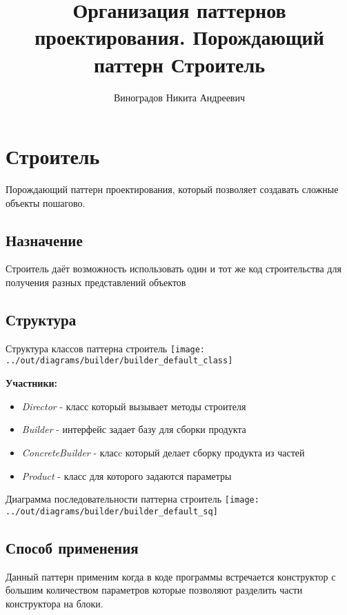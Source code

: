 \documentclass[PI,LAB]{HSEUniversity}
\title{Организация паттернов проектирования. Порождающий паттерн Строитель}
\author{Виноградов Никита Андреевич}
\begin{document}
    \maketitle



    \chapter{Строитель}
      Порождающий паттерн проектирования, который позволяет создавать сложные объекты пошагово. 
    \section{Назначение}
   Строитель даёт возможность использовать один и тот же код строительства для получения разных представлений объектов
    \section{Структура}

    \begin{FIGURE}[h]{Структура классов паттерна строитель\label{fig:example-figure}}
       \texttt{[image: ../out/diagrams/builder/builder\_default\_class]}
    \end{FIGURE}

    \textbf{Участники:}
   		\begin{itemize}
   			\item \emph{Director} - класс который вызывает методы строителя
   			\item \emph{Builder} - интерфейс задает базу для сборки продукта
   			\item \emph{ConcreteBuilder} - класc который делает сборку продукта из частей
   			\item \emph{Product} - класс для которого задаются параметры
   		\end{itemize}

 \begin{FIGURE}[h]{Диаграмма последовательности паттерна строитель\label{fig:example-figure}}
	\texttt{[image: ../out/diagrams/builder/builder\_default\_sq]}
\end{FIGURE}
    \section{Способ применения}
    Данный паттерн применим когда в коде программы встречается конструктор с большим количеством параметров которые позволяют разделить части конструктора на блоки.
    
\end{document}

